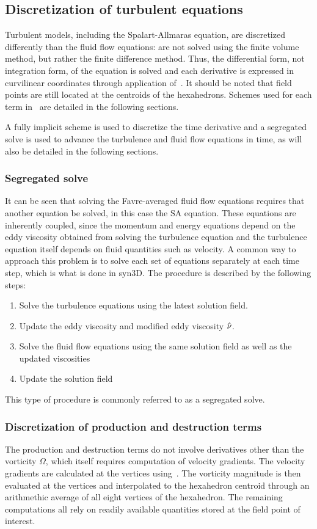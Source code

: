 \subsection{Discretization of turbulent equations}
\label{sec:synturb}
Turbulent models, including the Spalart-Allmaras equation, are discretized differently than the fluid flow equations: are not solved using the finite volume method, but rather the finite difference method. Thus, the differential form, not integration form, of the equation is solved and each derivative is expressed in curvilinear coordinates through application of~. It should be noted that field points are still located at the centroids of the hexahedrons. Schemes used for each term in~ are detailed in the following sections.

A fully implicit scheme is used to discretize the time derivative and a segregated solve is used to advance the turbulence and fluid flow equations in time, as will also be detailed in the following sections.
%
\subsubsection{Segregated solve}
%
It can be seen that solving the Favre-averaged fluid flow equations requires that another equation be solved, in this case the SA equation. These equations are inherently coupled, since the momentum and energy equations depend on the eddy viscosity obtained from solving the turbulence equation and the turbulence equation itself depends on fluid quantities such as velocity. A common way to approach this problem is to solve each set of equations separately at each time step, which is what is done in syn3D. The procedure is described by the following steps:
\begin{enumerate}
    \item Solve the turbulence equations using the latest solution field.
    \item Update the eddy viscosity and modified eddy viscosity $\sa$.
    \item Solve the fluid flow equations using the same solution field as well as the updated viscosities
    \item Update the solution field
\end{enumerate}
This type of procedure is commonly referred to as a segregated solve.
%
\subsubsection{Discretization of production and destruction terms}
The production and destruction terms do not involve derivatives other than the vorticity $\Omega$, which itself requires computation of velocity gradients. The velocity gradients are calculated at the vertices using~. The vorticity magnitude is then evaluated at the vertices and interpolated to the hexahedron centroid through an arithmethic average of all eight vertices of the hexahedron. The remaining computations all rely on readily available quantities stored at the field point of interest.
%
